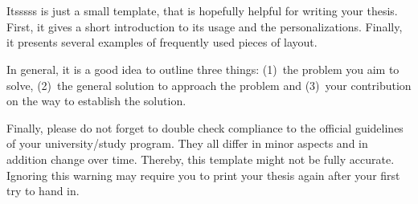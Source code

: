 \documentclass[../main.tex]{subfiles}
\begin{document}
\chapter*{\myAbstractTitle}

Itsssss is just a small template, that is hopefully helpful for writing your thesis.
First, it gives a short introduction to its usage and the personalizations.
Finally, it presents several examples of frequently used pieces of layout.

In general, it is a good idea to outline three things:
(1)~the problem you aim to solve,
(2)~the general solution to approach the problem and
(3)~your contribution on the way to establish the solution.

Finally, please do not forget to double check compliance to the official guidelines of your university/study program.
They all differ in minor aspects and in addition change over time.
Thereby, this template might not be fully accurate.
Ignoring this warning may require you to print your thesis again after your first try to hand in.
\end{document}

